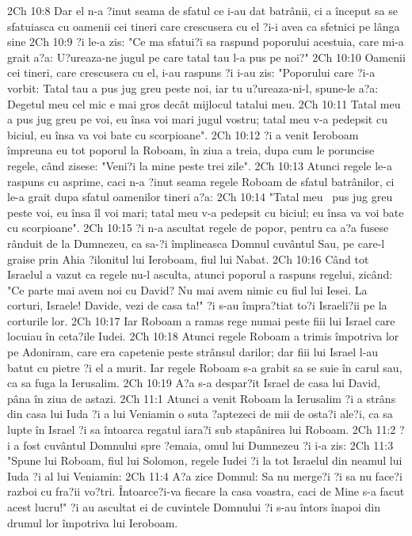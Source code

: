 2Ch 10:8  Dar el n-a ?inut seama de sfatul ce i-au dat batrânii, ci a început sa se sfatuiasca cu oamenii cei tineri care crescusera cu el ?i-i avea ca sfetnici pe lânga sine
2Ch 10:9  ?i le-a zis: "Ce ma sfatui?i sa raspund poporului acestuia, care mi-a grait a?a: U?ureaza-ne jugul pe care tatal tau l-a pus pe noi?"
2Ch 10:10  Oamenii cei tineri, care crescusera cu el, i-au raspuns ?i i-au zis: "Poporului care ?i-a vorbit: Tatal tau a pus jug greu peste noi, iar tu u?ureaza-ni-l, spune-le a?a: Degetul meu cel mic e mai gros decât mijlocul tatalui meu.
2Ch 10:11  Tatal meu a pus jug greu pe voi, eu însa voi mari jugul vostru; tatal meu v-a pedepsit cu biciul, eu însa va voi bate cu scorpioane".
2Ch 10:12  ?i a venit Ieroboam împreuna eu tot poporul la Roboam, în ziua a treia, dupa cum le poruncise regele, când zisese: "Veni?i la mine peste trei zile".
2Ch 10:13  Atunci regele le-a raspuns cu asprime, caci n-a ?inut seama regele Roboam de sfatul batrânilor, ci le-a grait dupa sfatul oamenilor tineri a?a:
2Ch 10:14  "Tatal meu  pus jug greu peste voi, eu însa îl voi mari; tatal meu v-a pedepsit cu biciul; eu însa va voi bate cu scorpioane".
2Ch 10:15  ?i n-a ascultat regele de popor, pentru ca a?a fusese rânduit de la Dumnezeu, ca sa-?i împlineasca Domnul cuvântul Sau, pe care-l graise prin Ahia ?ilonitul lui Ieroboam, fiul lui Nabat.
2Ch 10:16  Când tot Israelul a vazut ca regele nu-l asculta, atunci poporul a raspuns regelui, zicând: "Ce parte mai avem noi cu David? Nu mai avem nimic cu fiul lui Iesei. La corturi, Israele! Davide, vezi de casa ta!" ?i s-au împra?tiat to?i Israeli?ii pe la corturile lor.
2Ch 10:17  Iar Roboam a ramas rege numai peste fiii lui Israel care locuiau în ceta?ile Iudei.
2Ch 10:18  Atunci regele Roboam a trimis împotriva lor pe Adoniram, care era capetenie peste strânsul darilor; dar fiii lui Israel l-au batut cu pietre ?i el a murit. Iar regele Roboam s-a grabit sa se suie în carul sau, ca sa fuga la Ierusalim.
2Ch 10:19  A?a s-a despar?it Israel de casa lui David, pâna în ziua de astazi.
2Ch 11:1  Atunci a venit Roboam la Ierusalim ?i a strâns din casa lui Iuda ?i a lui Veniamin o suta ?aptezeci de mii de osta?i ale?i, ca sa lupte în Israel ?i sa întoarca regatul iara?i sub stapânirea lui Roboam.
2Ch 11:2  ?i a fost cuvântul Domnului spre ?emaia, omul lui Dumnezeu ?i i-a zis:
2Ch 11:3  "Spune lui Roboam, fiul lui Solomon, regele Iudei ?i la tot Israelul din neamul lui Iuda ?i al lui Veniamin:
2Ch 11:4  A?a zice Domnul: Sa nu merge?i ?i sa nu face?i razboi cu fra?ii vo?tri. Întoarce?i-va fiecare la casa voastra, caci de Mine s-a facut acest lucru!" ?i au ascultat ei de cuvintele Domnului ?i s-au întors înapoi din drumul lor împotriva lui Ieroboam.
